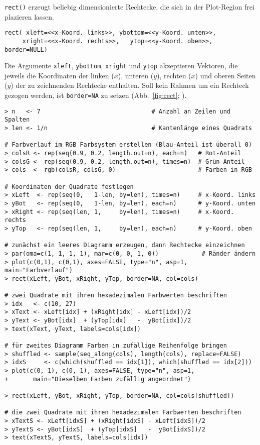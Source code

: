 \lstinline!rect()! erzeugt beliebig dimensionierte Rechtecke, die sich in der Plot-Region frei plazieren lassen.
\begin{lstlisting}
rect( xleft=<<x-Koord. links>>, ybottom=<<y-Koord. unten>>,
     xright=<<x-Koord. rechts>>,   ytop=<<y-Koord. oben>>, border=NULL)
\end{lstlisting}

Die Argumente \lstinline!xleft!, \lstinline!ybottom!, \lstinline!xright! und \lstinline!ytop! akzeptieren Vektoren, die jeweils die Koordinaten der linken ($x$), unteren ($y$), rechten ($x$) und oberen Seiten ($y$) der zu zeichnenden Rechtecke enthalten. Soll kein Rahmen um ein Rechteck gezogen werden, ist \lstinline!border=NA! zu setzen (Abb.\ \ref{fig:rect}; ).
\begin{lstlisting}
> n   <- 7                               # Anzahl an Zeilen und Spalten
> len <- 1/n                             # Kantenlänge eines Quadrats

# Farbverlauf im RGB Farbsystem erstellen (Blau-Anteil ist überall 0)
> colsR <- rep(seq(0.9, 0.2, length.out=n), each=n)   # Rot-Anteil
> colsG <- rep(seq(0.9, 0.2, length.out=n), times=n)  # Grün-Anteil
> cols  <- rgb(colsR, colsG, 0)                       # Farben in RGB

# Koordinaten der Quadrate festlegen
> xLeft  <- rep(seq(0,   1-len, by=len), times=n)     # x-Koord. links
> yBot   <- rep(seq(0,   1-len, by=len), each=n)      # y-Koord. unten
> xRight <- rep(seq(len, 1,     by=len), times=n)     # x-Koord. rechts
> yTop   <- rep(seq(len, 1,     by=len), each=n)      # y-Koord. oben

# zunächst ein leeres Diagramm erzeugen, dann Rechtecke einzeichnen
> par(oma=c(1, 1, 1, 1), mar=c(0, 0, 1, 0))            # Ränder ändern
> plot(c(0,1), c(0,1), axes=FALSE, type="n", asp=1, main="Farbverlauf")
> rect(xLeft, yBot, xRight, yTop, border=NA, col=cols)

# zwei Quadrate mit ihren hexadezimalen Farbwerten beschriften
> idx   <- c(10, 27)
> xText <- xLeft[idx] + (xRight[idx] - xLeft[idx])/2
> yText <- yBot[idx]  + (yTop[idx]   -  yBot[idx])/2
> text(xText, yText, labels=cols[idx])

# für zweites Diagramm Farben in zufällige Reihenfolge bringen
> shuffled <- sample(seq_along(cols), length(cols), replace=FALSE)
> idxS     <- c(which(shuffled == idx[1]), which(shuffled == idx[2]))
> plot(c(0, 1), c(0, 1), axes=FALSE, type="n", asp=1,
+       main="Dieselben Farben zufällig angeordnet")

> rect(xLeft, yBot, xRight, yTop, border=NA, col=cols[shuffled])

# die zwei Quadrate mit ihren hexadezimalen Farbwerten beschriften
> xTextS <- xLeft[idxS] + (xRight[idxS] - xLeft[idxS])/2
> yTextS <- yBot[idxS]  + (yTop[idxS]   -  yBot[idxS])/2
> text(xTextS, yTextS, labels=cols[idx])
\end{lstlisting}

